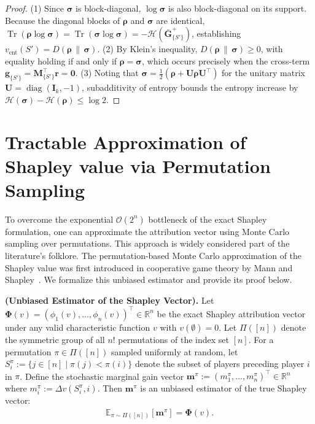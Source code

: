 \begin{proof}
(1) Since $\boldsymbol{\sigma}$ is block-diagonal, $\log \boldsymbol{\sigma}$ is also block-diagonal on its support. Because the diagonal blocks of $\boldsymbol{\rho}$ and $\boldsymbol{\sigma}$ are identical, $\operatorname{Tr}(\boldsymbol{\rho} \log \boldsymbol{\sigma}) = \operatorname{Tr}(\boldsymbol{\sigma} \log \boldsymbol{\sigma}) = -\mathcal{H}(\bar{\mathbf{G}}^{+}_{\{S'\}})$, establishing $v_{\text{ent}}(S') = D(\boldsymbol{\rho} \,\|\, \boldsymbol{\sigma})$. 
(2) By Klein's inequality, $D(\boldsymbol{\rho} \,\|\, \boldsymbol{\sigma}) \ge 0$, with equality holding if and only if $\boldsymbol{\rho} = \boldsymbol{\sigma}$, which occurs precisely when the cross-term $\mathbf{g}_{\{S'\}} = \mathbf{M}_{\{S'\}}^\top \mathbf{r} = \mathbf{0}$. 
(3) Noting that $\boldsymbol{\sigma} = \frac{1}{2}(\boldsymbol{\rho} + \mathbf{U}\boldsymbol{\rho}\mathbf{U}^\top)$ for the unitary matrix $\mathbf{U} = \operatorname{diag}(\mathbf{I}_k, -1)$, subadditivity of entropy bounds the entropy increase by $\mathcal{H}(\boldsymbol{\sigma}) - \mathcal{H}(\boldsymbol{\rho}) \le \log 2$.
\end{proof}

\section{Tractable Approximation of Shapley value via Permutation Sampling}
\label{subsec:tractable_approximation}

To overcome the exponential $\mathcal{O}(2^n)$ bottleneck of the exact Shapley formulation, one can approximate the attribution vector using Monte Carlo sampling over permutations. This approach is widely considered part of the literature's folklore. The permutation-based Monte Carlo approximation of the Shapley value was first introduced in cooperative game theory by Mann and Shapley~\cite{mann1960values}.  We formalize this unbiased estimator and provide its proof below.

\begin{lemma}\label{lemma:unbiased_estimator}
\textbf{(Unbiased Estimator of the Shapley Vector).}
Let $\boldsymbol{\Phi}(v) = (\phi_1(v), \dots, \phi_n(v))^\top \in \mathbb{R}^n$ be the exact Shapley attribution vector under any valid characteristic function $v$ with $v(\emptyset) = 0$. Let $\Pi([n])$ denote the symmetric group of all $n!$ permutations of the index set $[n]$. For a permutation $\pi \in \Pi([n])$ sampled uniformly at random, let $S_i^\pi := \{j \in [n] \mid \pi(j) < \pi(i)\}$ denote the subset of players preceding player $i$ in $\pi$. Define the stochastic marginal gain vector $\mathbf{m}^\pi := (m_1^\pi, \dots, m_n^\pi)^\top \in \mathbb{R}^n$ where $m_i^\pi := \Delta v(S_i^\pi, i)$. Then $\mathbf{m}^\pi$ is an unbiased estimator of the true Shapley vector:
\begin{align}
    \mathbb{E}_{\pi \sim \Pi([n])}[\mathbf{m}^\pi] = \boldsymbol{\Phi}(v).
\end{align}
\end{lemma}

